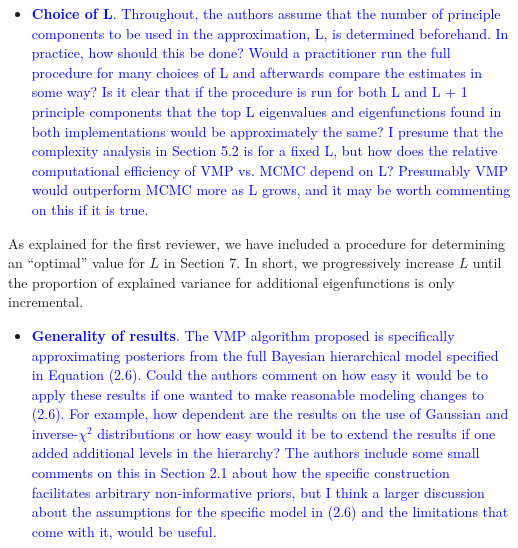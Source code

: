 \documentclass[12pt]{article}
\theoremstyle{plain}
\theoremstyle{definition}
\theoremstyle{remark}
\begin{document}
\vspace{1\baselineskip}

\begin{itemize}
	\item[\textcolor{blue}{\textbullet}] \textcolor{blue}{
		\textbf{Choice of L}. Throughout, the authors assume that the number of principle components to be used in the
		approximation, L, is determined beforehand. In practice, how should this be done? Would a practitioner run the full
		procedure for many choices of L and afterwards compare the estimates in some way? Is it clear that if the procedure is
		run for both L and L + 1 principle components that the top L eigenvalues and eigenfunctions found in both implementations
		would be approximately the same? I presume that the complexity analysis in Section 5.2 is for a fixed L, but how does
		the relative computational efficiency of VMP vs. MCMC depend on L? Presumably VMP would outperform MCMC more
		as L grows, and it may be worth commenting on this if it is true.
	}
\end{itemize}

\vspace{1\baselineskip}

As explained for the first reviewer,
we have included a procedure for determining an ``optimal'' value for $L$ in Section 7. In
short, we progressively increase $L$ until the proportion of explained variance for additional eigenfunctions
is only incremental.

\vspace{2\baselineskip}

\begin{itemize}
	\item[\textcolor{blue}{\textbullet}] \textcolor{blue}{
		\textbf{Generality of results}. The VMP algorithm proposed is specifically approximating posteriors from
		the full Bayesian hierarchical model specified in Equation (2.6). Could the authors comment on how easy
		it would be to apply these results if one wanted to make reasonable modeling changes to (2.6). For example,
		how dependent are the results on the use of Gaussian and inverse-$\chi^2$ distributions or how easy would
		it be to extend the results if one added additional levels in the hierarchy? The authors include some small
		comments on this in Section 2.1 about how the specific construction facilitates arbitrary non-informative priors,
		but I think a larger discussion about the assumptions for the specific model in (2.6) and the limitations that
		come with it, would be useful.
	}
\end{itemize}
\end{document}
